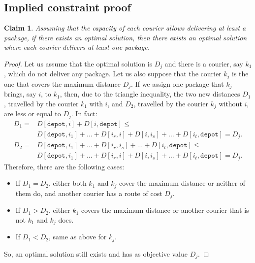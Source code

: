 \documentclass{article}
\newtheorem{lem}{Claim}
\begin{document}
    \begin{appendices}
        \section{Implied constraint proof} \label{sec:impl_proof}
        \begin{lem}
            Assuming that the capacity of each courier allows delivering at least a package, if there exists an optimal solution, then there exists an optimal solution where each courier delivers at least one package.
        \end{lem}
        \begin{proof}
            Let us assume that the optimal solution is $D_j$ and there is a courier, say $k_1$, which do not deliver any package. Let us also suppose that the courier $k_j$ is the one that covers the maximum distance $D_j$. If we assign one package that $k_j$ brings, say $i$, to $k_1$, then, due to the triangle inequality, the two new distances $D_1$, travelled by the courier $k_1$ with $i$, and $D_2$, travelled by the courier $k_j$ without $i$, are less or equal to $D_j$. In fact:
            \begin{equation}
                \begin{split}
                    D_1 = &D[\texttt{depot},i] + D[i,\texttt{depot}] \leq\\
                        & D[\texttt{depot}, i_1] + \dots + D[i_r, i] + D[i, i_s] + \dots + D[i_t, \texttt{depot}] = D_j.
                \end{split}
            \end{equation}
            \begin{equation}
                \begin{split}
                    D_2 = &D[\texttt{depot},i_1] + \dots + D[i_r,i_s] + \dots + D[i_t, \texttt{depot}] \leq\\
                    &D[\texttt{depot}, i_1] + \dots + D[i_r, i] + D[i, i_s] + \dots + D[i_t, \texttt{depot}] = D_j.
                \end{split}
            \end{equation}
            Therefore, there are the following cases:
            \begin{itemize}
                \item If $D_1 = D_2$, either both $k_1$ and $k_j$ cover the maximum distance or neither of them do, and another courier has a route of cost $D_j$.
                \item If $D_1 > D_2$, either $k_1$ covers the maximum distance or another courier that is not $k_1$ and $k_j$ does.
                \item If $D_1 < D_2$, same as above for $k_j$.
            \end{itemize}
            So, an optimal solution still exists and has as objective value $D_j$.
        \end{proof}
    \end{appendices}
\end{document}

